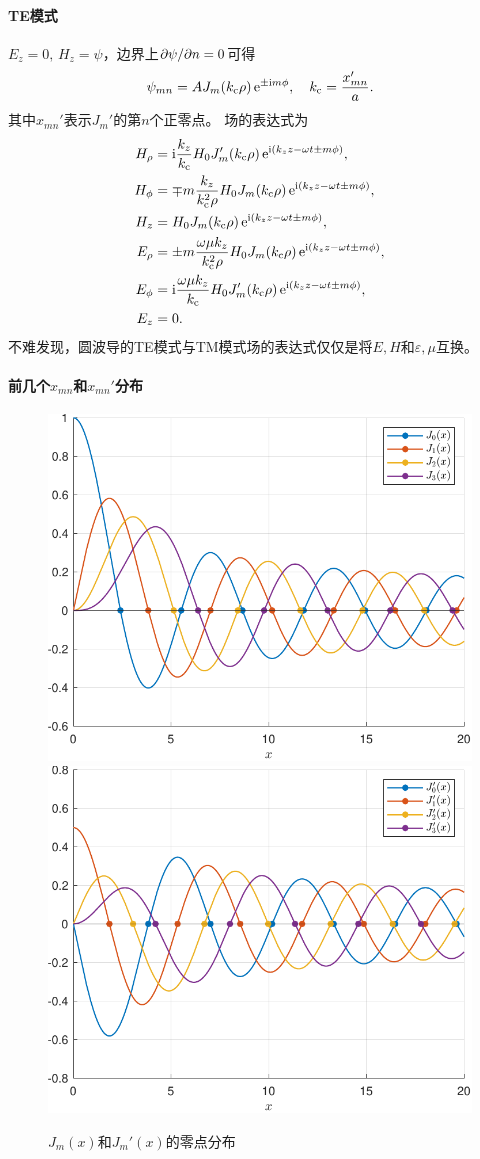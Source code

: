 \paragraph{TE模式}

$E_z=0,\,H_z=\psi$，边界上$\partial\psi/\partial n=0$可得
\begin{equation}
    \psi_{mn}=AJ_m(k_\text c\rho)\mathop{}\!\mathrm{e}^{\pm\mathrm{i} m\phi},\quad k_\text c=\frac{x_{mn}'}a.
\end{equation}
其中$x_{mn}'$表示$J_m'$的第$n$个正零点。
场的表达式为
\begin{subequations}
    \begin{align*}
        H_\rho&=\mathrm{i}\frac{k_z}{k_\text c}H_0J_m'(k_\text c\rho)\mathop{}\!\mathrm{e}^{\mathrm{i}(k_zz-\omega t\pm m\phi)},\\
        H_\phi&=\mp m\frac{k_z}{k_\text c^2\rho}H_0J_m(k_\text c\rho)\mathop{}\!\mathrm{e}^{\mathrm{i}(k_zz-\omega t\pm m\phi)},\\
        H_z&=H_0J_m(k_\text c\rho)\mathop{}\!\mathrm{e}^{\mathrm{i}(k_zz-\omega t\pm m\phi)},\\
        E_\rho&=\pm m\frac{\omega\mu k_z}{k_\text c^2\rho}H_0J_m(k_\text c\rho)\mathop{}\!\mathrm{e}^{\mathrm{i}(k_zz-\omega t\pm m\phi)},\\
        E_\phi&=\mathrm{i}\frac{\omega\mu k_z}{k_\text c}H_0J_m'(k_\text c\rho)\mathop{}\!\mathrm{e}^{\mathrm{i}(k_zz-\omega t\pm m\phi)},\\
        E_z&=0.
    \end{align*}
\end{subequations}
不难发现，圆波导的TE模式与TM模式场的表达式仅仅是将$E,H$和$\varepsilon,\mu$互换。

\paragraph{前几个$x_{mn}$和$x_{mn}'$分布}

\begin{figure}[H]
    \centering
        {\includegraphics[width=0.45\linewidth]{graphs/BesselJzero.pdf}}
        {\includegraphics[width=0.45\linewidth]{graphs/BesselJpzero.pdf}}
    \caption{$J_m(x)$和$J_m'(x)$的零点分布}
    \label{fig:Bessel function zeros}
\end{figure}

